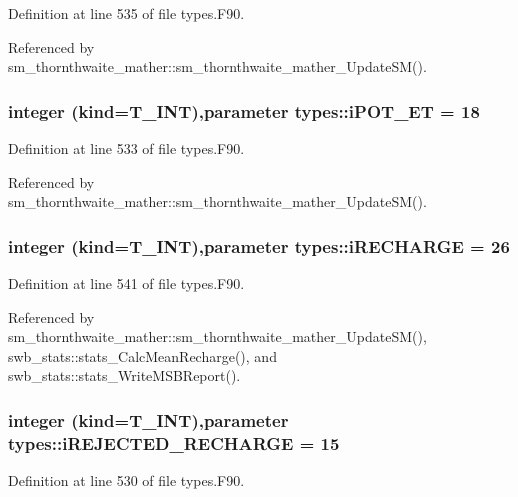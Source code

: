 Definition at line 535 of file types.F90.



Referenced by sm\_\-thornthwaite\_\-mather::sm\_\-thornthwaite\_\-mather\_\-UpdateSM().

\hypertarget{namespacetypes_a5c8388d67ca88816f13bf84e0247c604}{
\subsubsection[{iPOT\_\-ET}]{\setlength{\rightskip}{0pt plus 5cm}integer (kind={\bf T\_\-INT}),parameter {\bf types::iPOT\_\-ET} = 18}}
\label{namespacetypes_a5c8388d67ca88816f13bf84e0247c604}


Definition at line 533 of file types.F90.



Referenced by sm\_\-thornthwaite\_\-mather::sm\_\-thornthwaite\_\-mather\_\-UpdateSM().

\hypertarget{namespacetypes_adeda65abed18e31c0f523efc82f84bde}{
\subsubsection[{iRECHARGE}]{\setlength{\rightskip}{0pt plus 5cm}integer (kind={\bf T\_\-INT}),parameter {\bf types::iRECHARGE} = 26}}
\label{namespacetypes_adeda65abed18e31c0f523efc82f84bde}


Definition at line 541 of file types.F90.



Referenced by sm\_\-thornthwaite\_\-mather::sm\_\-thornthwaite\_\-mather\_\-UpdateSM(), swb\_\-stats::stats\_\-CalcMeanRecharge(), and swb\_\-stats::stats\_\-WriteMSBReport().

\hypertarget{namespacetypes_ae14eacf3547df95bf9f8678645f92a42}{
\subsubsection[{iREJECTED\_\-RECHARGE}]{\setlength{\rightskip}{0pt plus 5cm}integer (kind={\bf T\_\-INT}),parameter {\bf types::iREJECTED\_\-RECHARGE} = 15}}
\label{namespacetypes_ae14eacf3547df95bf9f8678645f92a42}


Definition at line 530 of file types.F90.



